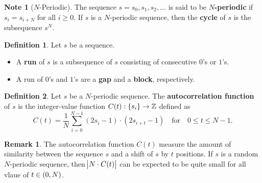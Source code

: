 \documentclass[12pt,openany]{book}
\theoremstyle{definition}
\newtheorem{definition}{Definition}[chapter]
\newtheorem{remark}{Remark}[chapter]
\newtheorem*{note}{Note}
\newcommand{\Z}{\mathbb{Z}}
\begin{document}
	\begin{note}[$N$-Periodic]
		The sequence $s=s_0,s_1,s_2,\dots$ is said to be \textbf{$N$-periodic} if $
		s_i=s_{i+N}
		$ for all $i\geq 0$. If $s$ is a $N$-periodic sequence, then the \textbf{cycle} of $s$ is the subsequence $s^N$.
	\end{note}
	\vspace{12pt}
	\begin{tcolorbox}[colback=white,colframe=defcolor,arc=5pt,title={\color{white}\bf Run - Gap / Block}]
		\begin{definition}
			Let $s$ be a sequence. \begin{itemize}
				\item A \textbf{run} of $s$ is a subsequence of $s$ consisting of consecutive $0$'s or $1$'s.
				\item A run of $0$'s and $1$'s are a \textbf{gap} and a \textbf{block}, respectively.
			\end{itemize}
		\end{definition}
	\end{tcolorbox}
	\vspace{24pt}
	\begin{tcolorbox}[colback=white,colframe=defcolor,arc=5pt,title={\color{white}\bf Autocorrelation Function}]
		\begin{definition}
			Let $s$ be a $N$-periodic sequence. The \textbf{autocorrelation function} of $s$ is the integer-value function $C(t):\set{s_i}\to\Z$ defined as \[
			C(t) = \frac{1}{N}\sum_{i=0}^{N-1}(2s_i - 1) \cdot (2s_{i+t} - 1)\quad\text{for}\quad 0\leq t\leq N-1.
			\]
		\end{definition}
	\end{tcolorbox}
	\begin{remark}
		The autocorrelation function $C(t)$ measure the amount of similarity between the sequence $s$ and a shift of $s$ by $t$ positions. If $s$ is a random $N$-periodic sequence, then $\abs{N\cdot C(t)}$ can be expected to be quite small for all vlaue of $t\in\intoo{0,N}$. 
	\end{remark}
\end{document}
